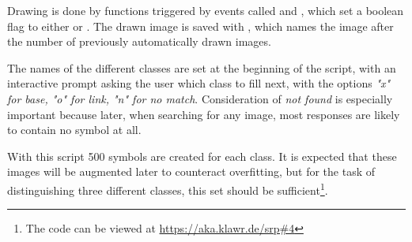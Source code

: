 Drawing is done by functions triggered by events called  and , which set a boolean  flag to either  or .
The drawn image is saved with , which names the image after the number of previously automatically drawn images.

The names of the different classes are set at the beginning of the script, with an interactive prompt asking the user which class to fill next, with the options \textit{"x" for base, "o" for link, "n" for no match}.
Consideration of \textit{not found} is especially important because later, when searching for any image, most responses are likely to contain no symbol at all.

With this script 500 symbols are created for each class.
It is expected that these images will be augmented later to counteract overfitting, but for the task of distinguishing three different classes, this set should be sufficient\footnote{The code can be viewed at \url{https://aka.klawr.de/srp\#4}}.


